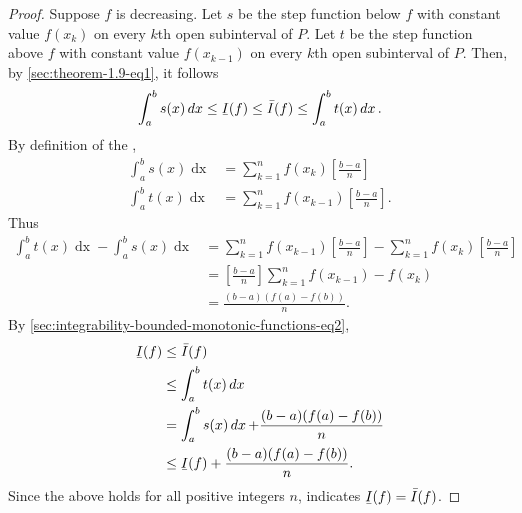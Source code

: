 \documentclass{report}
\newcommand{\ubar}[1]{\text{\b{$#1$}}}
\begin{document}
\begin{proof}
    Suppose $f$ is decreasing.
    Let $s$ be the step function below $f$ with constant value $f(x_k)$
      on every $k$th open subinterval of $P$.
    Let $t$ be the step function above $f$ with constant value $f(x_{k-1})$
      on every $k$th open subinterval of $P$.
    Then, by \eqref{sec:theorem-1.9-eq1}, it follows
      \begin{equation}
        \label{sec:integrability-bounded-monotonic-functions-eq2}
        \int_a^b s(x) \mathop{dx} \leq \ubar{I}(f)
          \leq \bar{I}(f) \leq \int_a^b t(x) \mathop{dx}.
      \end{equation}
    By definition of the ,
      \begin{align*}
        \int_a^b s(x) \mathop{dx}
          & = \sum_{k=1}^n f(x_k)\left[\frac{b - a}{n}\right] \\
        \int_a^b t(x) \mathop{dx}
          & = \sum_{k=1}^n f(x_{k-1})\left[\frac{b - a}{n}\right].
      \end{align*}
    Thus
      \begin{align*}
        \int_a^b t(x) \mathop{dx} - \int_a^b s(x) \mathop{dx}
          & = \sum_{k=1}^n f(x_{k-1})\left[\frac{b - a}{n}\right] -
              \sum_{k=1}^n f(x_k)\left[\frac{b - a}{n}\right] \\
          & = \left[\frac{b - a}{n}\right] \sum_{k=1}^n f(x_{k-1}) - f(x_k) \\
          & = \frac{(b - a)(f(a) - f(b))}{n}.
      \end{align*}
    By \eqref{sec:integrability-bounded-monotonic-functions-eq2},
      \begin{align*}
        \ubar{I}(f)
          & \leq \bar{I}(f) \\
          & \leq \int_a^b t(x) \mathop{dx} \\
          & = \int_a^b s(x) \mathop{dx} + \frac{(b - a)(f(a) - f(b))}{n} \\
          & \leq \ubar{I}(f) + \frac{(b - a)(f(a) - f(b))}{n}.
      \end{align*}
    Since the above holds for all positive integers $n$,
       indicates $\ubar{I}(f) = \bar{I}(f)$.

\end{proof}

\section{}%
\label{sec:calculation-integral-bounded-monotonic-function}
\label{sec:theorem-1.13}
\end{document}
